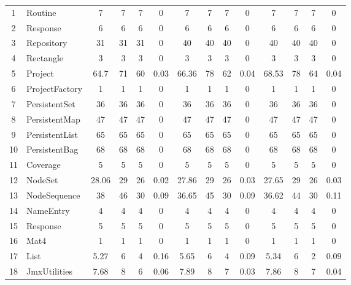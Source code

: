 \documentclass[conference]{IEEEtran}
\begin{document}
\begin{table} [ht]
{\begin{tabular}{|c|l|c|c|c|c|c|c|c|c|c|c|c|c|}
 1						& Routine						& 7	&	7	&	7	& 		0					& 7		&  7		& 7		& 		0			& 7			& 7			& 7			&	0	\\
 2						& Response					& 6	&	6	&	6	& 		0					& 6		&  6		& 6		& 		0			& 6			& 6			& 6			&	0	\\
 3						& Repository					& 31	&	31	&	31	& 		0					& 40		&  40		& 40		& 		0			& 40			& 40			& 40			&	0	\\      
 4						& Rectangle					& 3	&	3	&	3	& 		0					& 3		&  3 		& 3		& 		0			& 3			& 3			& 3			&	0	\\      
 5						& Project						& 64.7&	71	&	60	& 		0.03					& 66.36	&  78		& 62		& 		0.04			& 68.53		& 78			& 64			&	0.04	\\      
 6						& ProjectFactory				& 1	&	1	&	1	& 		0					& 1		&  1		& 1		& 		0			& 1			& 1			& 1			&	0	\\      
 7						& PersistentSet					& 36	&	36	&	36	& 		0					& 36		&  36		& 36		& 		0			& 36			& 36			& 36 			&	0	\\      
 8						& PersistentMap				& 47	&	47	&	47	& 		0					& 47		&  47		& 47		& 		0			& 47			& 47			& 47			&	0	\\      
 9						& PersistentList					& 65	&	65	&	65	& 		0					& 65		&  65		& 65		& 		0			& 65			& 65			& 65			&	0	\\      
 10						& PersistentBag				& 68	&	68	&	68	& 		0					& 68		&  68		& 68		& 		0			& 68			& 68			& 68			&	0	\\      
 11						& Coverage					& 5	&	5	&	5	& 		0					& 5		& 5		& 5		& 		0			& 5			& 5			& 5			&	0	\\      
 12						& NodeSet					& 28.06&	29	&	26	& 		0.02					& 27.86	& 29 		& 26		& 		0.03			& 27.65		& 29			& 26			&	0.03	\\      
 13						& NodeSequence				& 38	&	46	&	30	& 		0.09					& 36.65	& 45 		& 30		& 		0.09			& 36.62		& 44			& 30			&	0.11	\\      
 14						& NameEntry					& 4	&	4	&	4	& 		0					& 4		& 4 		& 4		& 		0			& 4			& 4			& 4			&	0\\      
 15						& Response					& 5	&	5	&	5	& 		0					& 5		& 5 		& 5		& 		0			& 5			& 5			& 5			&	0\\      
 16						& Mat4						& 1	&	1	&	1	& 		0					& 1		&  1		& 1		& 		0			& 1			& 1			& 1			&	0\\      
 17						& List						& 5.27&	6	&	4	& 		0.16					& 5.65	& 6 		& 4		& 		0.09			& 5.34		& 6			& 2			&	0.09\\      
 18						& JmxUtilities					& 7.68&	8	&	6	& 		0.06					& 7.89	& 8 		& 7		& 		0.03			& 7.86		& 8			& 7			&	0.04\\      

\end{tabular}}
\end{table}
\end{document}
